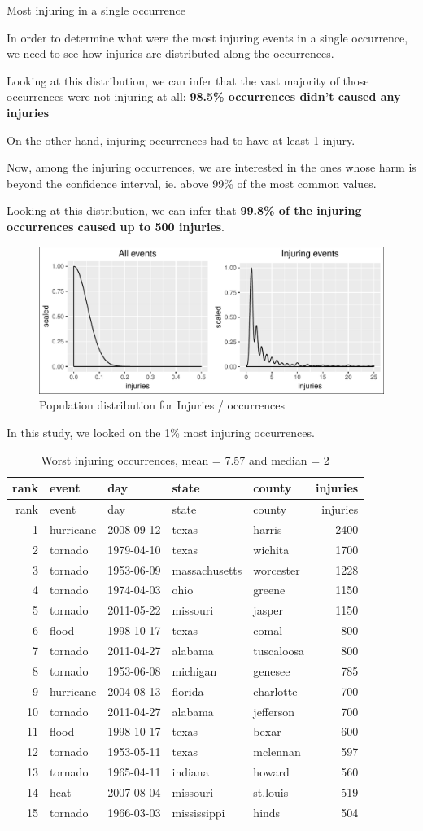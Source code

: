 \documentclass[]{article}
\begin{document}
Most injuring in a single occurrence

In order to determine what were the most injuring events in a single
occurrence, we need to see how injuries are distributed along the
occurrences.

Looking at this distribution, we can infer that the vast majority of
those occurrences were not injuring at all: \textbf{98.5\% occurrences
didn't caused any injuries}

On the other hand, injuring occurrences had to have at least 1 injury.

Now, among the injuring occurrences, we are interested in the ones whose
harm is beyond the confidence interval, ie. above 99\% of the most
common values.

Looking at this distribution, we can infer that \textbf{99.8\% of the
injuring occurrences caused up to 500 injuries}.

\begin{figure}[htbp]
\centering
\includegraphics{readme_files/figure-latex/inj-distribution-1.pdf}
\caption{Population distribution for Injuries / occurrences}
\end{figure}

In this study, we looked on the 1\% most injuring occurrences.

\begin{longtable}[]{@{}rllllr@{}}
\caption{Worst injuring occurrences, mean = 7.57 and median =
2}\tabularnewline
\toprule
rank & event & day & state & county & injuries\tabularnewline
\midrule
\endfirsthead
\toprule
rank & event & day & state & county & injuries\tabularnewline
\midrule
\endhead
1 & hurricane & 2008-09-12 & texas & harris & 2400\tabularnewline
2 & tornado & 1979-04-10 & texas & wichita & 1700\tabularnewline
3 & tornado & 1953-06-09 & massachusetts & worcester &
1228\tabularnewline
4 & tornado & 1974-04-03 & ohio & greene & 1150\tabularnewline
5 & tornado & 2011-05-22 & missouri & jasper & 1150\tabularnewline
6 & flood & 1998-10-17 & texas & comal & 800\tabularnewline
7 & tornado & 2011-04-27 & alabama & tuscaloosa & 800\tabularnewline
8 & tornado & 1953-06-08 & michigan & genesee & 785\tabularnewline
9 & hurricane & 2004-08-13 & florida & charlotte & 700\tabularnewline
10 & tornado & 2011-04-27 & alabama & jefferson & 700\tabularnewline
11 & flood & 1998-10-17 & texas & bexar & 600\tabularnewline
12 & tornado & 1953-05-11 & texas & mclennan & 597\tabularnewline
13 & tornado & 1965-04-11 & indiana & howard & 560\tabularnewline
14 & heat & 2007-08-04 & missouri & st.louis & 519\tabularnewline
15 & tornado & 1966-03-03 & mississippi & hinds & 504\tabularnewline
\bottomrule
\end{longtable}
\end{document}
